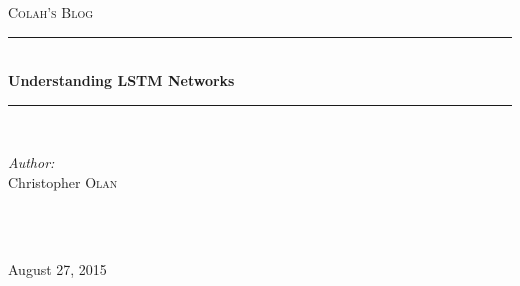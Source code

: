\documentclass[12pt]{article} %
\begin{document}

\begin{titlepage}

\newcommand{\HRule}{\rule{\linewidth}{0.5mm}} %

\center %

\textsc{\LARGE Colah's Blog}\\[1.5cm] %

\HRule \\[0.4cm]
{ \huge \bfseries Understanding LSTM Networks}\\[0.4cm] %
\HRule \\[1.5cm]

\begin{minipage}{0.4\textwidth}
\begin{flushleft} \large
\emph{Author:}\\
Christopher \textsc{Olan} %
\end{flushleft}
\end{minipage}
~
\begin{minipage}{0.4\textwidth}
\begin{flushright} \large
\end{flushright}
\end{minipage}\\[4cm]

{\large August 27, 2015}\\[3cm] %


\vfill %

\end{titlepage}

\end{document}
